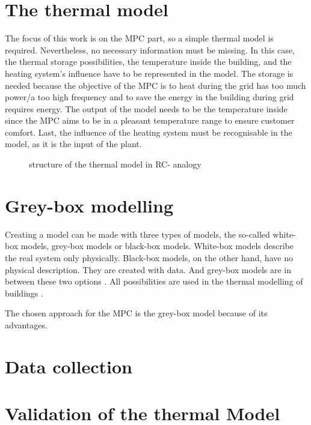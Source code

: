 \section{The thermal model}
\label{thermalmodel}

    The focus of this work is on the MPC part, so a simple thermal model is required. Nevertheless, no necessary information must be missing. In this case, the thermal storage possibilities, the temperature inside the building, and the heating system's influence have to be represented in the model. The storage is needed because the objective of the MPC is to heat during the grid has too much power/a too high frequency and to save the energy in the building during grid requires energy. The output of the model needs to be the temperature inside since the MPC aims to be in a pleasant temperature range to ensure customer comfort. Last, the influence of the heating system must be recognisable in the model, as it is the input of the plant. 
    \newline
    \begin{figure}
        \centering
        \def\svgwidth{320pt}
        
        \caption{structure of the thermal model in RC- analogy}
        \label{fig:structureThermalModel}
    \end{figure}
        

\section{Grey-box modelling}
\label{Grey-box modelling}

Creating a model can be made with three types of models, the so-called white-box models, grey-box models or black-box models. White-box models describe the real system only physically. Black-box models, on the other hand, have no physical description. They are created with data. And grey-box models are in between these two options \cite{Statusseminar.ForschungfurEnergieoptimiertesBauen.2009}. All possibilities are used in the thermal modelling of buildings \cite{Kramer.2012}.

The chosen approach for the MPC is the grey-box model because of its advantages.    

\section{Data collection}
\label{datacollection}

\section{Validation of the thermal Model}
\label{validationthermalmodel}



